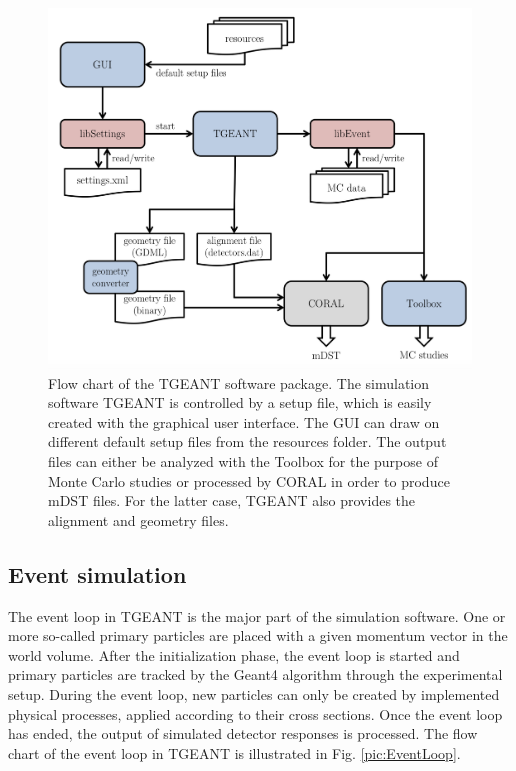 \begin{figure}[!h]
  \centering
	\includegraphics[scale=0.5]{./gfx/TGEANTflowchart.png}
	\caption{Flow chart of the TGEANT software package. The simulation software TGEANT is controlled by a setup file, which is easily created with the graphical user interface. The GUI can draw on different default setup files from the resources folder. The output files can either be analyzed with the Toolbox for the purpose of Monte Carlo studies or processed by CORAL in order to produce mDST files. For the latter case, TGEANT also provides the alignment and geometry files.}
	\label{pic:TGEANTflowchart}
\end{figure}

\subsection{Event simulation}

The event loop in TGEANT is the major part of the simulation software. One or more so-called primary particles are placed with a given momentum vector in the world volume. After the initialization phase, the event loop is started and primary particles are tracked by the Geant4 algorithm through the experimental setup. During the event loop, new particles can only be created by implemented physical processes, applied according to their cross sections. Once the event loop has ended, the output of simulated detector responses is processed. The flow chart of the event loop in TGEANT is illustrated in Fig. \ref{pic:EventLoop}.

